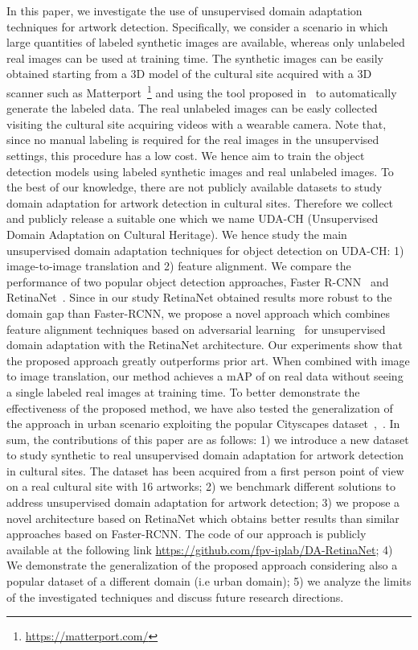 \documentclass[preprint]{elsarticle}
\begin{document}
In this paper, we investigate the use of unsupervised domain adaptation techniques for artwork detection. Specifically, we consider a scenario in which large quantities of labeled synthetic images are available, whereas only unlabeled real images can be used at training time. The synthetic images can be easily obtained starting from a 3D model of the cultural site acquired with a 3D scanner such as Matterport~\footnote{\url{https://matterport.com/}} and using the tool proposed in~\cite{orlando2020egocentric} to automatically generate the labeled data. The real unlabeled images can be easly collected visiting the cultural site acquiring videos with a wearable camera. Note that, since no manual labeling is required for the real images in the unsupervised settings, this procedure has a low cost. We hence aim to train the object detection models using labeled synthetic images and real unlabeled images. To the best of our knowledge, there are not publicly available datasets to study domain adaptation for artwork detection in cultural sites. Therefore we collect and publicly release a suitable one which we name UDA-CH (Unsupervised Domain Adaptation on Cultural Heritage). We hence study the main unsupervised domain adaptation techniques for object detection on UDA-CH: 1) image-to-image translation and 2) feature alignment. We compare the performance of two popular object detection approaches, Faster R-CNN~\cite{DBLP:journals/corr/RenHG015} and RetinaNet~\cite{DBLP:journals/corr/abs-1708-02002}. Since in our study RetinaNet obtained results more robust to the domain gap than Faster-RCNN, we propose a novel approach which combines feature alignment techniques based on adversarial learning~\cite{ganin2014unsupervised} for unsupervised domain adaptation with the RetinaNet architecture. Our experiments show that the proposed approach greatly outperforms prior art. When combined with image to image translation, our method achieves a mAP of  on real data without seeing a single labeled real images at training time. To better demonstrate the effectiveness of the proposed method, we have also tested the generalization of the approach in urban scenario exploiting the popular Cityscapes dataset~\cite{cordts2016cityscapes},~\cite{sakaridis2018semantic}.
\newline
In sum, the contributions of this paper are as follows: 1) we introduce a new dataset to study synthetic to real unsupervised domain adaptation for artwork detection in cultural sites. The dataset has been acquired from a first person point of view on a real cultural site with 16 artworks; 2) we benchmark different solutions to address unsupervised domain adaptation for artwork detection; 3) we propose a novel architecture based on RetinaNet which obtains better results than similar approaches based on Faster-RCNN. The code of our approach is publicly available at the following link \url{https://github.com/fpv-iplab/DA-RetinaNet}; 4) We demonstrate the generalization of the proposed approach considering also a popular dataset of a different domain (i.e urban domain); 5) we analyze the limits of the investigated techniques and discuss future research directions. \newline
\end{document}
